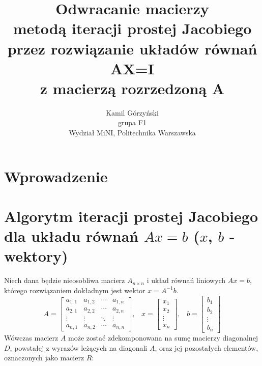 \documentclass[a4paper,margin=1.54cm]{article}
\title{Odwracanie macierzy\\metodą iteracji prostej Jacobiego\\przez rozwiązanie układów równań AX=I\\z macierzą rozrzedzoną A}
\author{Kamil Górzyński\\grupa F1\\Wydział MiNI, Politechnika Warszawska}
\begin{document}
\begin{titlepage}
\maketitle
\end{titlepage}

\section{Wprowadzenie}

\section{Algorytm iteracji prostej Jacobiego\\dla układu równań $Ax = b$ ($x$, $b$ - wektory) }

Niech dana będzie nieosobliwa macierz $A_{n\times n}$ i układ równań liniowych 
$ Ax = b $, \\
którego rozwiązaniem dokładnym jest wektor $x = A^{-1}b$.
\[
A = 
 \begin{bmatrix}
  a_{1,1} & a_{1,2} & \cdots & a_{1,n} \\
  a_{2,1} & a_{2,2} & \cdots & a_{2,n} \\
  \vdots  & \vdots  & \ddots & \vdots  \\
  a_{n,1} & a_{n,2} & \cdots & a_{n,n} 
 \end{bmatrix}
\textrm{,} \quad 
x = 
 \begin{bmatrix}
  x_{1}\\
  x_{2}\\
  \vdots\\
  x_{n}
 \end{bmatrix}
 \textrm{,} \quad 
b = 
 \begin{bmatrix}
  b_{1}\\
  b_{2}\\
  \vdots\\
  b_{n}
 \end{bmatrix}
\]
Wówczas macierz $A$ może zostać zdekomponowana na sumę macierzy diagonalnej $D$, powstałej z wyrazów leżących na diagonali $A$, oraz jej pozostałych elementów, oznaczonych jako macierz $R$: \cite{krupka2009wstep}\cite{stoerwstep} 
\end{document}

